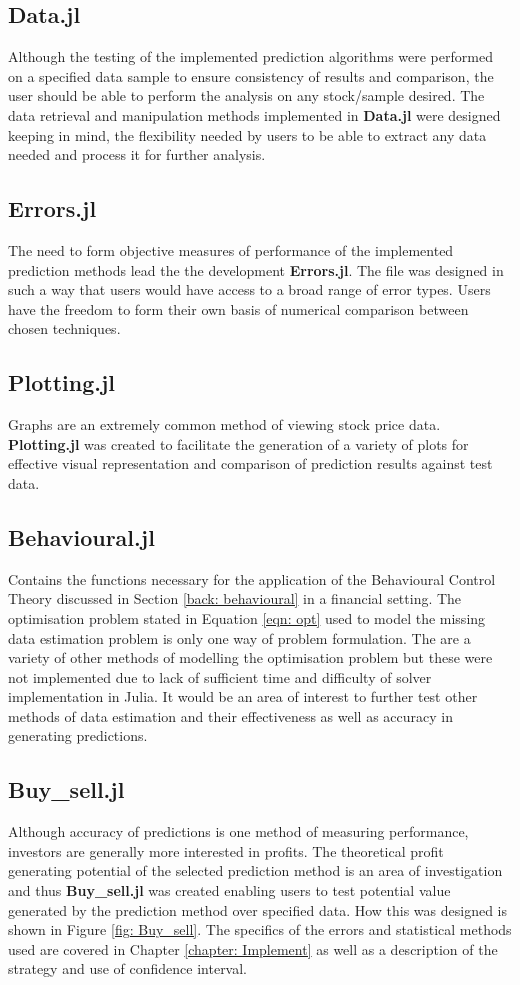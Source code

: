 \subsection{Data.jl}
Although the testing of the implemented prediction algorithms were performed on a specified data sample to ensure consistency of results and comparison, the user should be able to perform the analysis on any stock/sample desired. The data retrieval and manipulation methods implemented in \textbf{Data.jl} were designed keeping in mind, the flexibility needed by users to be able to extract any data needed and process it for further analysis.

\subsection{Errors.jl}
The need to form objective measures of performance of the implemented prediction methods lead the the development \textbf{Errors.jl}. The file was designed in such a way that users would have access to a broad range of error types. Users have the freedom to form their own basis of numerical comparison between chosen techniques. 

\subsection{Plotting.jl}
Graphs are an extremely common method of viewing stock price data. \textbf{Plotting.jl} was created to facilitate the generation of a variety of plots for effective visual representation and comparison of prediction results against test data.

\subsection{Behavioural.jl}
Contains the functions necessary for the application of the Behavioural Control Theory discussed in Section \ref{back: behavioural} in a financial setting. The optimisation problem stated in Equation \ref{eqn: opt} used to model the missing data estimation problem is only one way of problem formulation. The are a variety of other methods of modelling the optimisation problem but these were not implemented due to lack of sufficient time and difficulty of solver implementation in Julia. It would be an area of interest to further test other methods of data estimation and their effectiveness as well as accuracy in generating predictions.

\subsection{Buy\_sell.jl}
Although accuracy of predictions is one method of measuring performance, investors are generally more interested in profits. The theoretical profit generating potential of the selected prediction method is an area of investigation and thus \textbf{Buy\_sell.jl} was created enabling users to test potential value generated by the prediction method over specified data. How this was designed is shown in Figure \ref{fig: Buy_sell}. The specifics of the errors and statistical methods used are covered in Chapter \ref{chapter: Implement} as well as a description of the strategy and use of confidence interval.


